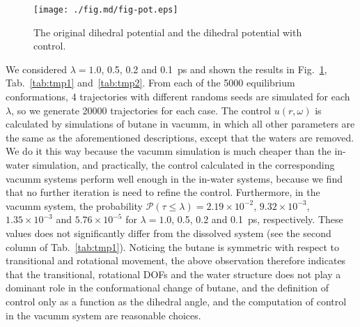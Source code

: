 \documentclass[final]{siamltex}
\begin{document}
\begin{figure}
  \centering
  \texttt{[image: ./fig.md/fig-pot.eps]}
  \caption{The original dihedral potential and the dihedral potential
    with control.}
  \label{fig:tmp2}
\end{figure}


We considered $\lambda = 1.0$, 0.5, 0.2 and 0.1~ps and shown the
results in Fig.~\ref{fig:tmp2}, Tab.~\ref{tab:tmp1} and~\ref{tab:tmp2}.
From each of the 5000 equilibrium conformations, 4 trajectories with
different randoms seeds are simulated for each $\lambda$, so we
generate 20000 trajectories for each case.  The control $u(r, \omega)$ is
calculated by simulations of butane in vacumm, in which all other
parameters are the same as the aforementioned descriptions, except
that the waters are removed. We do it this way because the vacumm
simulation is much cheaper than the in-water simulation, and
practically, the control calculated in the corresponding vacumm
systems perform well enough in the in-water systems, because we find
that no further iteration is need to refine the control. Furthermore,
in the vacumm system, the probability $\mathcal{P}(\tau\leq\lambda) =
2.19\times10^{-2}$, $9.32\times 10^{-3}$, $1.35\times 10^{-3}$ and
$5.76\times 10^{-5}$ for $\lambda = 1.0$, 0.5, 0.2 and 0.1~ps,
respectively. These values does not significantly differ from the
dissolved system (see the second column of Tab.~\ref{tab:tmp1}).
Noticing the butane is symmetric with respect to transitional and
rotational movement, the above observation therefore indicates that
the transitional, rotational DOFs and the water structure does not
play a dominant role in the conformational change of butane, and the
definition of control only as a function as the dihedral angle, and
the computation of control in the vacumm system are reasonable
choices.  
\end{document}
